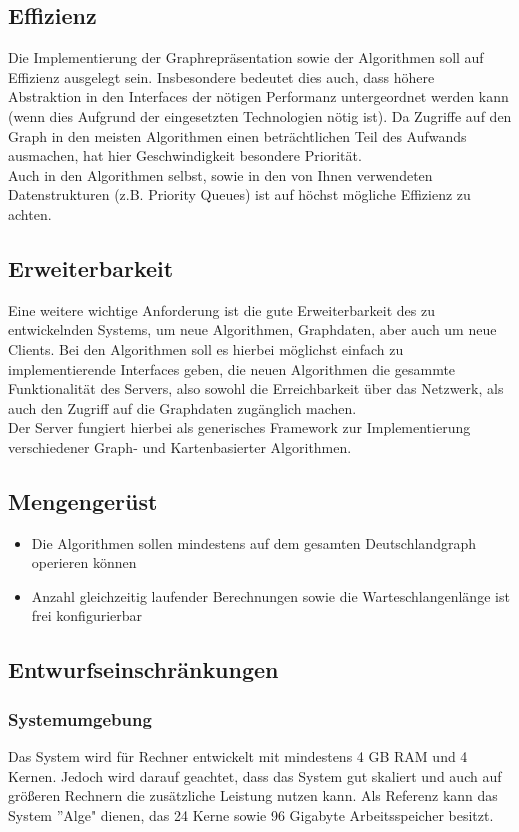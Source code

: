 \documentclass[a4paper,10pt,titlepage]{article}
\begin{document}
\subsection{Effizienz}
Die Implementierung der Graphrepräsentation sowie der Algorithmen soll auf Effizienz ausgelegt sein.
Insbesondere bedeutet dies auch, dass höhere Abstraktion in den Interfaces der nötigen Performanz
untergeordnet werden kann (wenn dies Aufgrund der eingesetzten Technologien nötig ist). Da Zugriffe auf den Graph in den meisten Algorithmen einen beträchtlichen Teil des Aufwands ausmachen, hat hier
Geschwindigkeit besondere Priorität.\\
Auch in den Algorithmen selbst, sowie in den von Ihnen verwendeten Datenstrukturen (z.B. Priority Queues) ist auf höchst mögliche Effizienz zu achten.
\subsection{Erweiterbarkeit}
Eine weitere wichtige Anforderung ist die gute Erweiterbarkeit des zu entwickelnden Systems, um neue Algorithmen, Graphdaten, aber auch um neue Clients.
Bei den Algorithmen soll es hierbei möglichst einfach zu implementierende Interfaces geben, die neuen Algorithmen die gesammte Funktionalität des Servers,
also sowohl die Erreichbarkeit über das Netzwerk, als auch den Zugriff auf die Graphdaten zugänglich machen.\\
Der Server fungiert hierbei als generisches Framework zur Implementierung verschiedener Graph- und Kartenbasierter Algorithmen.
\subsection{Mengengerüst}
\label{Mengengeruest}

\begin{itemize}
 \item Die Algorithmen sollen mindestens auf dem gesamten Deutschlandgraph operieren können
 \item Anzahl gleichzeitig laufender Berechnungen sowie die Warteschlangenlänge ist frei konfigurierbar
\end{itemize}

\subsection{Entwurfseinschränkungen}
\subsubsection{Systemumgebung}
Das System wird für Rechner entwickelt mit mindestens 4 GB RAM und 4 Kernen. Jedoch wird darauf geachtet, dass das System gut skaliert und auch auf größeren Rechnern die zusätzliche Leistung nutzen kann.
Als Referenz kann das System ''Alge" dienen, das 24 Kerne sowie 96 Gigabyte Arbeitsspeicher besitzt.
\end{document}
